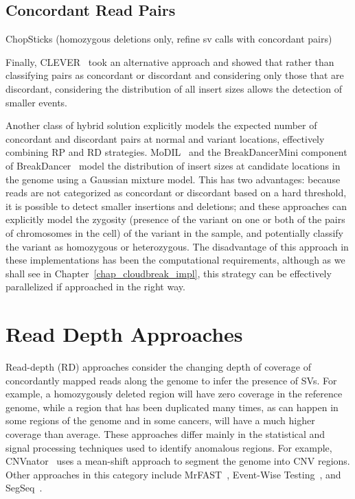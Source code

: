 \subsection{Concordant Read Pairs}\label{section_mixture_of_distributions}

ChopSticks (homozygous deletions only, refine sv calls with concordant pairs)~\cite{Yasuda:2012ij}

Finally, CLEVER~\cite{Marschall:2012ek} took an alternative approach and showed that rather than classifying pairs as concordant or discordant and considering only those that are discordant, considering the distribution of all insert sizes allows the detection of smaller events. 

Another class of hybrid solution explicitly models the expected number of concordant and discordant pairs at normal and variant locations, effectively combining RP and RD strategies. MoDIL~\cite{Lee:2009da} and the BreakDancerMini component of BreakDancer~\cite{Chen:2009p3} model the distribution of insert sizes at candidate locations in the genome using a Gaussian mixture model. This has two advantages: because reads are not categorized as concordant or discordant based on a hard threshold, it is possible to detect smaller insertions and deletions; and these approaches can explicitly model the zygosity (presence of the variant on one or both of the pairs of chromosomes in the cell) of the variant in the sample, and potentially classify the variant as homozygous or heterozygous. The disadvantage of this approach in these implementations has been the computational requirements, although as we shall see in Chapter~\ref{chap_cloudbreak_impl}, this strategy can be effectively parallelized if approached in the right way.

\section{Read Depth Approaches}

Read-depth (RD) approaches consider the changing depth of coverage of concordantly mapped reads along the genome to infer the presence of SVs. For example, a homozygously deleted region will have zero coverage in the reference genome, while a region that has been duplicated many times, as can happen in some regions of the genome and in some cancers, will have a much higher coverage than average. These approaches differ mainly in the statistical and signal processing techniques used to identify anomalous regions. For example, CNVnator~\cite{Abyzov:2011bk} uses a mean-shift approach to segment the genome into CNV regions. Other approaches in this category include MrFAST~\cite{Alkan:2009cr}, Event-Wise Testing~\cite{Yoon:2009kb}, and SegSeq~\cite{Chiang:2009di}.

